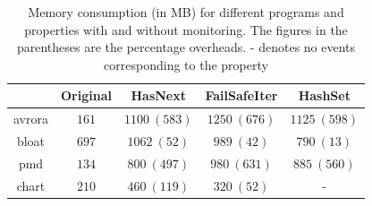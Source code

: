 \begin{table}[t]
\centering
\small
\begin{tabular}{|c|c|c|c|c|}
\hline
 & Original & HasNext & FailSafeIter & HashSet\\
 \hline
avrora  & $161$ & $1100\ (583)$& $1250\ (676)$ & $1125\ (598)$\\\hline
bloat & $697$  & $1062\ (52)$ & $989\ (42)$ & $790\ (13)$\\\hline
pmd  & $134$ & $800\ (497)$ & $980\ (631)$ & $885\ (560)$\\\hline
chart & $210$ & $460\ (119)$ & $320\ (52)$ & - \\\hline
\end{tabular}
\caption{Memory consumption (in MB) for different programs and properties with
and without monitoring. The figures in the parentheses are the percentage 
overheads.  - denotes no events corresponding to
the property %
}
\label{table:consumedmemory}
\end{table}


